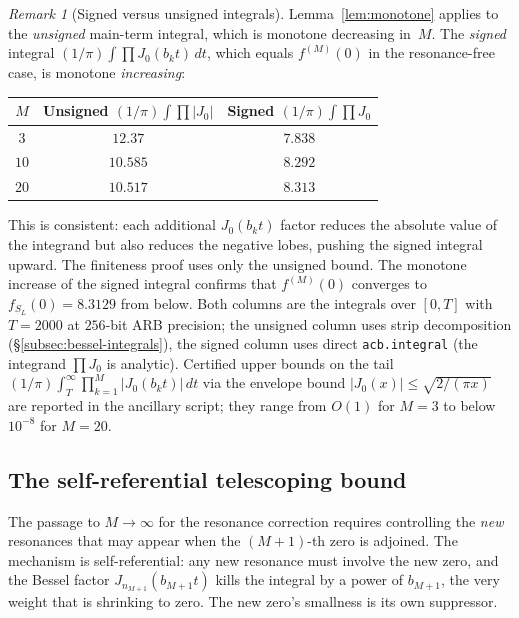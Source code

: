 \documentclass[12pt,reqno]{amsart}
\theoremstyle{plain}
\theoremstyle{definition}
\theoremstyle{remark}
\newtheorem{remark}[theorem]{Remark}
\begin{document}
\begin{remark}[Signed versus unsigned integrals]\label{rem:signed}
Lemma~\ref{lem:monotone} applies to the \emph{unsigned} main-term
integral, which is monotone decreasing in~$M$.
The \emph{signed} integral
$(1/\pi)\int \prod J_0(b_k t)\, dt$,
which equals $f^{(M)}(0)$ in the resonance-free case,
is monotone \emph{increasing}:
\begin{center}
\renewcommand{\arraystretch}{1.1}
{\small
\begin{tabular}{ccc}
\toprule
$M$ & Unsigned $(1/\pi)\!\int\!\prod|J_0|$ & Signed $(1/\pi)\!\int\!\prod J_0$ \\
\midrule
$3$ & $12.37$ & $7.838$ \\
$10$ & $10.585$ & $8.292$ \\
$20$ & $10.517$ & $8.313$ \\
\bottomrule
\end{tabular}
}
\end{center}
This is consistent: each additional $J_0(b_k t)$ factor reduces the absolute value of the integrand but also reduces the negative lobes, pushing the signed integral upward.  The finiteness proof uses only the unsigned bound.  The monotone increase of the signed integral confirms that $f^{(M)}(0)$ converges to $f_{S_L}(0) = 8.3129$ from below.  Both columns are the integrals over $[0, T]$ with $T = 2000$ at $256$-bit ARB precision; the unsigned column uses strip decomposition (\S\ref{subsec:bessel-integrals}), the signed column uses direct \texttt{acb.integral} (the integrand $\prod J_0$ is analytic).  Certified upper bounds on the tail $(1/\pi)\int_T^\infty \prod_{k=1}^M |J_0(b_k t)|\,dt$ via the envelope bound $|J_0(x)| \leq \sqrt{2/(\pi x)}$ are reported in the ancillary script; they range from $O(1)$ for $M = 3$ to below $10^{-8}$ for $M = 20$.
\end{remark}


\subsection{The self-referential telescoping bound}

The passage to $M \to \infty$ for the resonance correction requires controlling the \emph{new} resonances that may appear when the $(M+1)$-th zero is adjoined.  The mechanism is self-referential: any new resonance must involve the new zero, and the Bessel factor $J_{n_{M+1}}(b_{M+1} t)$ kills the integral by a power of $b_{M+1}$, the very weight that is shrinking to zero.  The new zero's smallness is its own suppressor.
\end{document}

